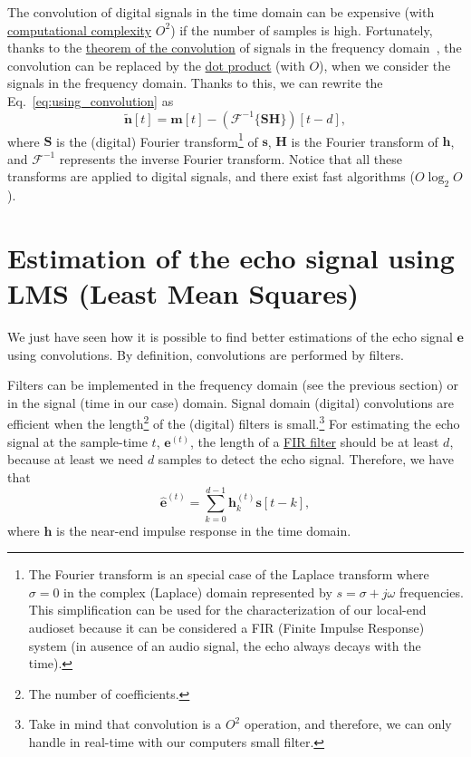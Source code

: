 The convolution of digital signals in the time domain can be expensive
(with
\href{https://en.wikipedia.org/wiki/Computational_complexity_theory}{computational
  complexity} $O^2$) if the number of samples is high. Fortunately,
thanks to the \href{https://en.wikipedia.org/wiki/Convolution}{theorem
  of the convolution} of signals in the frequency
domain~\cite{kovacevic2013fourier,Oppenheim2}, the convolution can be
replaced by the \href{https://en.wikipedia.org/wiki/Dot_product}{dot
  product} (with $O$), when we consider the signals in the frequency
domain. Thanks to this, we can rewrite the Eq.~\eqref{eq:using_convolution} as
\begin{equation}
  \tilde{\mathbf n}[t] = {\mathbf m}[t] - ({\mathcal F}^{-1}\{{\mathbf S}{\mathbf H}\})[t-d],
  \label{eq:faster}
\end{equation}
where ${\mathbf S}$ is the (digital) Fourier transform\footnote{The
  Fourier transform is an special case of the Laplace transform where
  $\sigma=0$ in the complex (Laplace) domain represented by
  $s=\sigma+j\omega$ frequencies. This simplification can be used for
  the characterization of our local-end audioset because it can be
  considered a FIR (Finite Impulse Response) system (in ausence of an
  audio signal, the echo always decays with the time).} of
${\mathbf s}$, ${\mathbf H}$ is the Fourier transform of
${\mathbf h}$, and ${\mathcal F}^{-1}$ represents the inverse Fourier
transform. Notice that all these transforms are applied to digital
signals, and there exist fast algorithms ($O\log_2O$).

\section{Estimation of the echo signal using LMS (Least Mean Squares)}
We just have seen how it is possible to find better estimations of the
echo signal ${\mathbf e}$ using convolutions. By definition,
convolutions are performed by filters. 

Filters can be implemented in the frequency domain (see the previous
section) or in the signal (time in our case) domain. Signal domain
(digital) convolutions are efficient when the length\footnote{The
  number of coefficients.} of the (digital) filters is
small.\footnote{Take in mind that convolution is a $O^2$
  operation, and therefore, we can only handle in real-time with our
  computers small filter.} For estimating the echo signal at the
sample-time $t$, ${\mathbf e}^{(t)}$, the length of a
\href{https://en.wikipedia.org/wiki/Finite_impulse_response}{FIR
  filter} should be at least $d$, because at least we need $d$ samples
to detect the echo signal. Therefore, we have that
\begin{equation}
  \hat{\mathbf e}^{(t)} = \sum_{k=0}^{d-1}{\mathbf h}_k^{(t)}{\mathbf s}[t-k],
\end{equation}
where ${\mathbf h}$ is the near-end impulse response in the time
domain.

